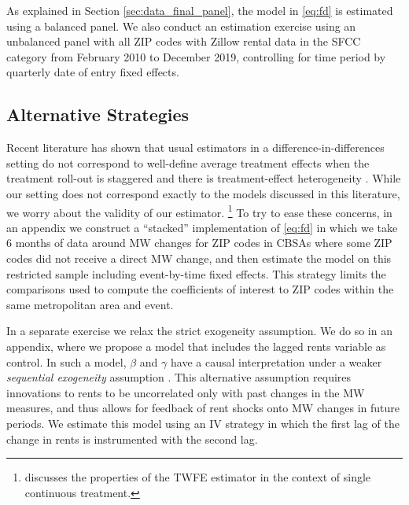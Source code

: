 
As explained in Section \ref{sec:data_final_panel}, 
the model in \eqref{eq:fd} is estimated using a balanced panel.
We also conduct an estimation exercise using an unbalanced panel with all 
ZIP codes with Zillow rental data in the SFCC category 
from February 2010 to December 2019, controlling for time period by 
quarterly date of entry fixed effects.

\subsection{Alternative Strategies}\label{sec:alt_emp_strategies}

Recent literature has shown that usual estimators in a difference-in-differences 
setting do not correspond to well-define average treatment effects when the 
treatment roll-out is staggered and there is treatment-effect heterogeneity 
\parencite{deChaisemartinEtAl2022,RothEtAl2022}.
While our setting does not correspond exactly to the models discussed in this
literature, we worry about the validity of our estimator.%
\footnote{\textcite[][Section 3.4]{CallawayEtAl2021} discusses the properties 
of the TWFE estimator in the context of single continuous treatment.}
To try to ease these concerns, in an appendix we construct a ``stacked'' 
implementation of \eqref{eq:fd} in which we take 6 months of data around MW 
changes for ZIP codes in CBSAs where some ZIP codes did not receive a direct 
MW change, 
and then estimate the model on this restricted sample including event-by-time 
fixed effects.
This strategy limits the comparisons used to compute the coefficients of 
interest to ZIP codes within the same metropolitan area and event.

In a separate exercise we relax the strict exogeneity assumption.
We do so in an appendix, where we propose a model that includes the lagged 
rents variable as control.
In such a model, $\beta$ and $\gamma$ have a causal interpretation under a 
weaker \textit{sequential exogeneity} assumption
\parencite{ArellanoBond1991, ArellanoHonore2001}.
This alternative assumption requires innovations to rents to be uncorrelated 
only with past changes in the MW measures, and thus allows for feedback of 
rent shocks onto MW changes in future periods.
We estimate this model using an IV strategy in which the first lag of the change
in rents is instrumented with the second lag.


